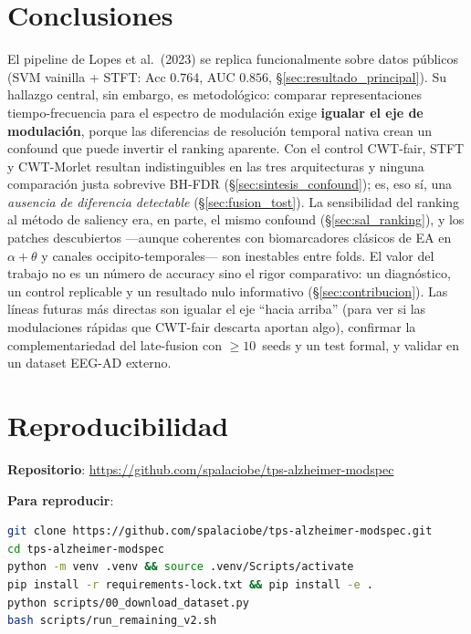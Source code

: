 \documentclass[11pt, a4paper]{article}
\begin{document}
\section{Conclusiones}

El pipeline de Lopes et al.~(2023) se replica funcionalmente sobre datos
públicos (SVM vainilla + STFT: Acc $0.764$, AUC $0.856$,
§\ref{sec:resultado_principal}). Su hallazgo central, sin embargo, es
metodológico: comparar representaciones tiempo-frecuencia para el espectro
de modulación exige \textbf{igualar el eje de modulación}, porque las
diferencias de resolución temporal nativa crean un confound que puede
invertir el ranking aparente. Con el control CWT-fair, STFT y CWT-Morlet
resultan indistinguibles en las tres arquitecturas y ninguna comparación
justa sobrevive BH-FDR (§\ref{sec:sintesis_confound}); es, eso sí, una
\emph{ausencia de diferencia detectable} (§\ref{sec:fusion_tost}). La sensibilidad del ranking al método de saliency
era, en parte, el mismo confound (§\ref{sec:sal_ranking}), y los patches
descubiertos ---aunque coherentes con biomarcadores clásicos de EA en
$\alpha+\theta$ y canales occipito-temporales--- son inestables entre folds.
El valor del trabajo no es un número de accuracy sino el rigor comparativo:
un diagnóstico, un control replicable y un resultado nulo informativo
(§\ref{sec:contribucion}). Las líneas futuras más directas son igualar el
eje ``hacia arriba'' (para ver si las modulaciones rápidas que CWT-fair
descarta aportan algo), confirmar la complementariedad del late-fusion con
$\geq10$~seeds y un test formal, y validar en un dataset EEG-AD externo.

\section{Reproducibilidad}

\textbf{Repositorio}: \url{https://github.com/spalaciobe/tps-alzheimer-modspec}

\textbf{Para reproducir}:
\begin{lstlisting}[language=bash]
git clone https://github.com/spalaciobe/tps-alzheimer-modspec.git
cd tps-alzheimer-modspec
python -m venv .venv && source .venv/Scripts/activate
pip install -r requirements-lock.txt && pip install -e .
python scripts/00_download_dataset.py
bash scripts/run_remaining_v2.sh
\end{lstlisting}
\end{document}
